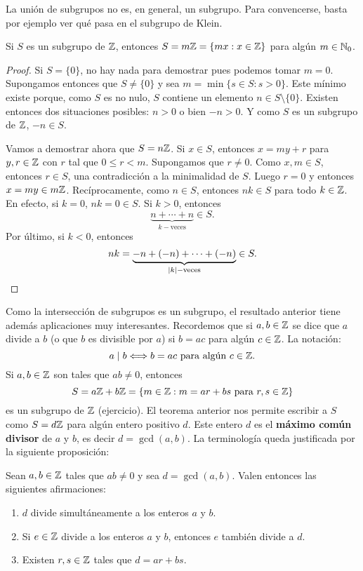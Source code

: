 La unión de subgrupos no es, en general, un subgrupo. Para convencerse, basta por ejemplo ver qué pasa 
en el subgrupo de Klein. 


\begin{theorem}
\label{thm:Z}
	Si $S$ es un subgrupo de $\mathbb{Z}$, entonces 
	$S=m\mathbb{Z}=\{mx:x\in \mathbb{Z}\}$
	para algún $m\in\mathbb{N}_0$.  
\end{theorem}
	
\begin{proof}
	Si $S=\{0\}$, no hay nada para demostrar pues podemos
	tomar $m=0$. Supongamos entonces que $S\ne\{0\}$ y sea $m=\min\{s\in S:s>0\}$. Este mínimo existe porque, como $S$ es no nulo, $S$ contiene un elemento $n\in S\setminus\{0\}$. Existen entonces dos situaciones posibles: $n>0$ o bien $-n>0$. Y como $S$ es un subgrupo de $\mathbb{Z}$, $-n\in S$.
	 
	Vamos a demostrar ahora que $S=n\mathbb{Z}$. 
	Si $x\in S$, entonces $x=my+r$ para $y,r\in\mathbb{Z}$ con $r$ tal que
	$0\leq r<m$. Supongamos que $r\ne 0$. Como $x,m\in S$, entonces $r\in S$,
	una contradicción a la minimalidad de $S$.  Luego $r=0$ y entonces $x=my\in
	m\mathbb{Z}$. Recíprocamente, como $n\in S$, entonces $nk\in S$ para todo $k\in\mathbb{Z}$. En efecto, si $k=0$, $nk=0\in S$. Si $k>0$, entonces 
	\[
	\underbrace{n+\cdots+n}_{k-\text{veces}}\in S.
	\]
	Por último, si $k<0$, entonces 
	\[
	nk=\underbrace{-n+(-n)+\cdots+(-n)}_{|k|-\text{veces}}\in S.\qedhere
	\]		
\end{proof}

Como la intersección de subgrupos es un subgrupo, 
el resultado anterior tiene además aplicaciones muy interesantes. Recordemos que si $a,b\in\mathbb{Z}$ 
se dice que $a$ divide a $b$ (o que $b$ es divisible por $a$) 
si $b=ac$ para algún $c\in\mathbb{Z}$. La notación: 
\[
a\mid b\Longleftrightarrow b=ac\text{ para algún $c\in\mathbb{Z}$.}
\]
Si $a,b\in\mathbb{Z}$ son tales que $ab\ne0$, entonces 
\[
S=a\mathbb{Z}+b\mathbb{Z}=\{m\in\mathbb{Z}:m=ar+bs\text{ para $r,s\in\mathbb{Z}$}\}
\]
es un subgrupo de $\mathbb{Z}$ (ejercicio). El teorema anterior nos permite escribir a $S$ como $S=d\mathbb{Z}$ para algún entero positivo $d$. Este entero $d$ 
es el \textbf{máximo común divisor} de $a$ y $b$, es decir $d=\gcd(a,b)$. La terminología queda justificada por la siguiente proposición:

\begin{proposition}
Sean $a,b\in\mathbb{Z}$ tales que $ab\ne0$ y sea $d=\gcd(a,b)$. Valen entonces las siguientes afirmaciones:
\begin{enumerate}
\item $d$ divide simultáneamente a los enteros $a$ y $b$. 
\item Si $e\in\mathbb{Z}$ divide a los enteros $a$ y $b$, entonces $e$ también divide a $d$.
\item Existen $r,s\in\mathbb{Z}$ tales que $d=ar+bs$. 
\end{enumerate}
\end{proposition}

